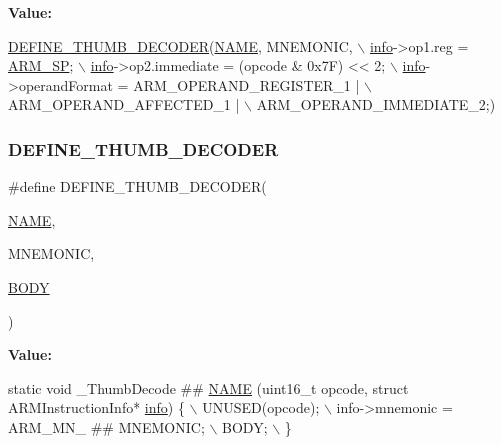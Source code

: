 {\bfseries Value\+:}
\begin{DoxyCode}
\mbox{\hyperlink{decoder-thumb_8c_a44d34ec3fd7c2c2ee51ff5966678c86e}{DEFINE\_THUMB\_DECODER}}(\mbox{\hyperlink{inflate_8h_a164ea0159d5f0b5f12a646f25f99eceaa67bc2ced260a8e43805d2480a785d312}{NAME}}, MNEMONIC, \(\backslash\)
        \mbox{\hyperlink{libretro_8h_structretro__game__info}{info}}->op1.reg = \mbox{\hyperlink{isa-thumb_8c_acce42da2f3c8524d613be6906db2e0c9}{ARM\_SP}}; \(\backslash\)
        \mbox{\hyperlink{libretro_8h_structretro__game__info}{info}}->op2.immediate = (opcode & 0x7F) << 2; \(\backslash\)
        \mbox{\hyperlink{libretro_8h_structretro__game__info}{info}}->operandFormat = ARM\_OPERAND\_REGISTER\_1 | \(\backslash\)
            ARM\_OPERAND\_AFFECTED\_1 | \(\backslash\)
            ARM\_OPERAND\_IMMEDIATE\_2;)
\end{DoxyCode}
\mbox{\label{decoder-thumb_8c_a44d34ec3fd7c2c2ee51ff5966678c86e}} 
\subsubsection{\texorpdfstring{D\+E\+F\+I\+N\+E\+\_\+\+T\+H\+U\+M\+B\+\_\+\+D\+E\+C\+O\+D\+ER}{DEFINE\_THUMB\_DECODER}}
{\footnotesize\ttfamily \#define D\+E\+F\+I\+N\+E\+\_\+\+T\+H\+U\+M\+B\+\_\+\+D\+E\+C\+O\+D\+ER(\begin{DoxyParamCaption}\item[{}]{\mbox{\hyperlink{inflate_8h_a164ea0159d5f0b5f12a646f25f99eceaa67bc2ced260a8e43805d2480a785d312}{N\+A\+ME}},  }\item[{}]{M\+N\+E\+M\+O\+N\+IC,  }\item[{}]{\mbox{\hyperlink{gzlog_8c_aa6bdf6a6d9916c343e1e17774d84a156}{B\+O\+DY}} }\end{DoxyParamCaption})}

{\bfseries Value\+:}
\begin{DoxyCode}
\textcolor{keyword}{static} \textcolor{keywordtype}{void} \_ThumbDecode ## \mbox{\hyperlink{inflate_8h_a164ea0159d5f0b5f12a646f25f99eceaa67bc2ced260a8e43805d2480a785d312}{NAME}} (uint16\_t opcode, \textcolor{keyword}{struct} ARMInstructionInfo* 
      \mbox{\hyperlink{libretro_8h_structretro__game__info}{info}}) \{ \(\backslash\)
        UNUSED(opcode); \(\backslash\)
        info->mnemonic = ARM\_MN\_ ## MNEMONIC; \(\backslash\)
        BODY; \(\backslash\)
    \}
\end{DoxyCode}


